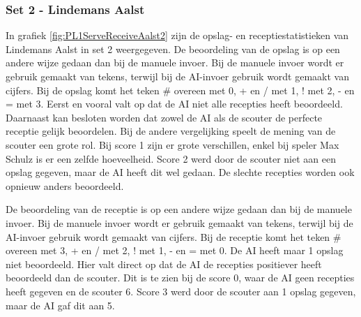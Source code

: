 \subsubsection{Set 2 - Lindemans Aalst}
\label{sec:PL1_Aalst2}
In grafiek \ref{fig:PL1ServeReceiveAalst2} zijn de opslag- en receptiestatistieken van Lindemans Aalst in set 2 weergegeven. De beoordeling van de opslag is op een andere wijze gedaan dan bij de manuele invoer. Bij de manuele invoer wordt er gebruik gemaakt van tekens, terwijl bij de AI-invoer gebruik wordt gemaakt van cijfers. Bij de opslag komt het teken \# overeen met 0, + en / met 1, ! met 2, - en = met 3. Eerst en vooral valt op dat de AI niet alle recepties heeft beoordeeld. Daarnaast kan besloten worden dat zowel de AI als de scouter de perfecte receptie gelijk beoordelen. Bij de andere vergelijking speelt de mening van de scouter een grote rol. Bij score 1 zijn er grote verschillen, enkel bij speler Max Schulz is er een zelfde hoeveelheid. Score 2 werd door de scouter niet aan een opslag gegeven, maar de AI heeft dit wel gedaan. De slechte recepties worden ook opnieuw anders beoordeeld.

De beoordeling van de receptie is op een andere wijze gedaan dan bij de manuele invoer. Bij de manuele invoer wordt er gebruik gemaakt van tekens, terwijl bij de AI-invoer gebruik wordt gemaakt van cijfers. Bij de receptie komt het teken \# overeen met 3, + en / met 2, ! met 1, - en = met 0. De AI heeft maar 1 opslag niet beoordeeld. Hier valt direct op dat de AI de recepties positiever heeft beoordeeld dan de scouter. Dit is te zien bij de score 0, waar de AI geen recepties heeft gegeven en de scouter 6. Score 3 werd door de scouter aan 1 opslag gegeven, maar de AI gaf dit aan 5.

